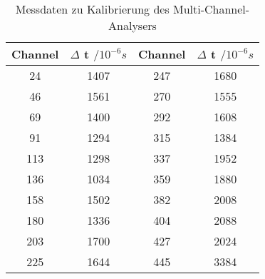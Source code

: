 \begin{table}[h!]
  \centering
  \caption{Messdaten zu Kalibrierung des Multi-Channel-Analysers}
  \label{tab:kalibrierung}
  \begin{tabular}{c c c c}
    \toprule
      Channel & $\Delta$ t $/ 10^{-6} s$ & Channel & $\Delta$ t $/ 10^{-6} s$ \\
      \midrule
         24   &   1407  &  247   &   1680 \\
         46   &   1561  &  270   &   1555 \\
         69   &   1400  &  292   &   1608 \\
         91   &   1294  &  315   &   1384 \\
        113   &   1298  &  337   &   1952 \\
        136   &   1034  &  359   &   1880 \\
        158   &   1502  &  382   &   2008 \\
        180   &   1336  &  404   &   2088 \\
        203   &   1700  &  427   &   2024 \\
        225   &   1644  &  445   &   3384 \\
    \bottomrule
  \end{tabular}
\end{table}

%
